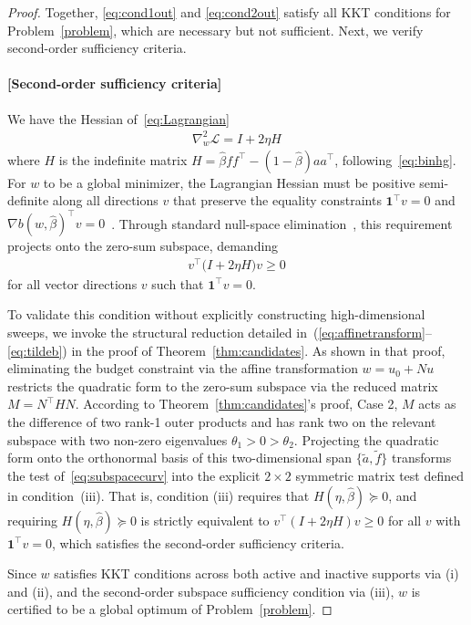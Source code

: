 \documentclass[11pt]{article}
\begin{document}
\begin{proof}
Together, \eqref{eq:cond1out} and \eqref{eq:cond2out} satisfy all KKT conditions for Problem~\eqref{problem}, which are necessary but not sufficient. Next, we verify second-order sufficiency criteria.

\paragraph{[Second-order sufficiency criteria]}
We have the Hessian of~\eqref{eq:Lagrangian}
\begin{align}
    \nabla_w^2 \mathcal L = I + 2\eta H \label{eq:laghessian}
\end{align}
where $H$ is the indefinite matrix $H = \hat\beta ff^\top - (1-\hat\beta)aa^\top$, following~\eqref{eq:binhg}.
For $w$ to be a global minimizer, the Lagrangian Hessian must be positive semi-definite along all directions $v$ that preserve the equality constraints $\mathbf 1^\top v = 0$ and $\nabla b(w, \hat\beta)^\top v = 0$~\citep{more1983computing}. Through standard null-space elimination~\citep{nocedal2006numerical}, this requirement projects onto the zero-sum subspace, demanding
\begin{align}
    v^\top \big(I + 2\eta H\big) v \ge 0 \label{eq:subspacecurv}
\end{align}
for all vector directions $v$ such that $\mathbf 1^\top v = 0$.

To validate this condition without explicitly constructing high-dimensional sweeps, we invoke the structural reduction detailed in~(\ref{eq:affinetransform}--\ref{eq:tildeb}) in the proof of Theorem~\ref{thm:candidates}. As shown in that proof, eliminating the budget constraint via the affine transformation $w = u_0 + Nu$ restricts the quadratic form to the zero-sum subspace via the reduced matrix $M = N^\top H N$.
According to Theorem~\ref{thm:candidates}'s proof, Case 2, $M$ acts as the difference of two rank-1 outer products and has rank two on the relevant subspace with two non-zero eigenvalues $\theta_1 > 0 > \theta_2$. Projecting the quadratic form onto the orthonormal basis of this two-dimensional span $\{\tilde{a}, \tilde{f}\}$ transforms the test of~\eqref{eq:subspacecurv} into the explicit $2\times2$ symmetric matrix test defined in condition~(iii). That is, condition (iii) requires that $H(\eta, \hat\beta) \succeq 0$, and requiring $H(\eta, \hat\beta) \succeq 0$ is strictly equivalent to $v^\top(I + 2\eta H)v \ge 0$ for all $v$ with $\mathbf 1^\top v = 0$, which satisfies the second-order sufficiency criteria.

Since $w$ satisfies KKT conditions across both active and inactive supports via (i) and (ii), and the second-order subspace sufficiency condition via (iii), $w$ is certified to be a global optimum of Problem~\eqref{problem}.
\end{proof}
\end{document}
